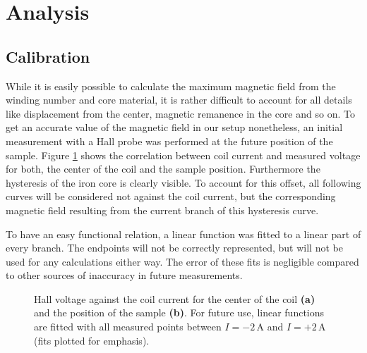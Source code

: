 \documentclass[a4paper]{scrartcl}
\numberwithin{equation}{section}
\numberwithin{figure}{section}
\numberwithin{table}{section}
\begin{document}
 
 
\section{Analysis}
\subsection{Calibration}
\label{sec:cali}
While it is easily possible to calculate the maximum magnetic field from the winding number and core material, it is rather difficult to account for all details like displacement from the center, magnetic remanence in the core and so on. To get an accurate value of the magnetic field in our setup nonetheless, an initial measurement with a Hall probe was performed at the future position of the sample. Figure \ref{fig:cali} shows the correlation between coil current and measured voltage for both, the center of the coil and the sample position. Furthermore the hysteresis of the iron core is clearly visible. To account for this offset, all following curves will be considered not against the coil current, but the corresponding magnetic field resulting from the current branch of this hysteresis curve.

To have an easy functional relation, a linear function was fitted to a linear part of every branch. The endpoints will not be correctly represented, but will not be used for any calculations either way. The error of these fits is negligible compared to other sources of inaccuracy in future measurements.
\begin{figure} 
 \centering
{}

\caption{
\small Hall voltage against the coil current for the center of the coil \textbf{(a)} and the position of the sample \textbf{(b)}. For future use, linear functions are fitted with all measured points between $I=-2\,\text{A}$ and $I=+2\,\text{A}$ (fits plotted for emphasis). } 
	\label{fig:cali}
\end{figure}
\end{document}
